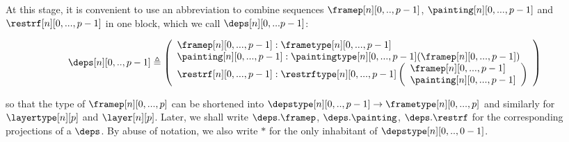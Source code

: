 \documentclass{msc}
\newcommand{\unitpoint}{\ensuremath{\ast}}
\newcommand{\defeq}{\ensuremath{\triangleq}}
\begin{document}
At this stage, it is convenient to use an abbreviation to combine sequences $\framep[n][0,..,p-1]$, $\painting[n][0,...,p-1]$ and $\restrf[n][0,...,p-1]$ in one block, which we call $\deps[n][0,...p-1]$:

\begin{align*}
  \deps[n][0,..,p-1] \defeq
  \left(\begin{array}{l}
            \framep[n][0,...,p-1] :\frametype[n][0,...,p-1] \\
            \painting[n][0,...,p-1] :\paintingtype[n][0,...,p-1]
            (\framep[n][0,...,p-1])                         \\
            \restrf[n][0,...,p-1]  :\restrftype[n][0,...,p-1]
            \left(\begin{array}{l}
                \framep[n][0,...,p-1]   \\
                \painting[n][0,...,p-1] \\
              \end{array}\right)                   \\
          \end{array}\right)
\end{align*}

so that the type of $\framep[n][0,...,p]$ can be shortened into $\depstype[n][0,..,p-1] \rightarrow \frametype[n][0,...,p]$ and similarly for $\layertype[n][p]$ and $\layer[n][p]$.
Later, we shall write $\deps.\framep$, $\deps.\painting$, $\deps.\restrf$ for the corresponding projections of a $\deps$. By abuse of notation, we also write $\unitpoint$ for the only inhabitant of $\depstype[n][0,..,0-1]$.
\end{document}
